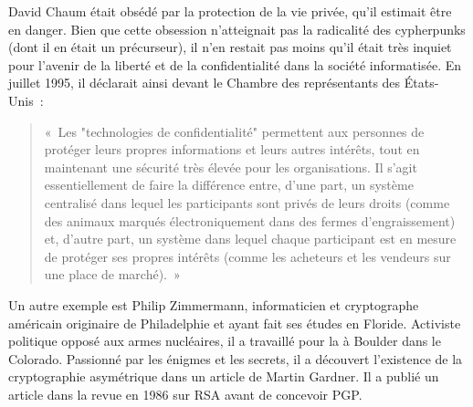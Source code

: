 David Chaum était obsédé par la protection de la vie privée, qu'il estimait être en danger. Bien que cette obsession n'atteignait pas la radicalité des cypherpunks (dont il en était un précurseur), il n'en restait pas moins qu'il était très inquiet pour l'avenir de la liberté et de la confidentialité dans la société informatisée. En juillet 1995, il déclarait ainsi devant le Chambre des représentants des États-Unis~:

\begin{quote}
«~Les "technologies de confidentialité" permettent aux personnes de protéger leurs propres informations et leurs autres intérêts, tout en maintenant une sécurité très élevée pour les organisations. Il s'agit essentiellement de faire la différence entre, d'une part, un système centralisé dans lequel les participants sont privés de leurs droits (comme des animaux marqués électroniquement dans des fermes d'engraissement) et, d'autre part, un système dans lequel chaque participant est en mesure de protéger ses propres intérêts (comme les acheteurs et les vendeurs sur une place de marché).~»
\end{quote} %

Un autre exemple est Philip Zimmermann, informaticien et cryptographe américain originaire de Philadelphie et ayant fait ses études en Floride. Activiste politique opposé aux armes nucléaires, il a travaillé pour la  à Boulder dans le Colorado. Passionné par les énigmes et les secrets, il a découvert l'existence de la cryptographie asymétrique dans un article de Martin Gardner. Il a publié un article dans la revue  en 1986 sur RSA avant de concevoir PGP.

